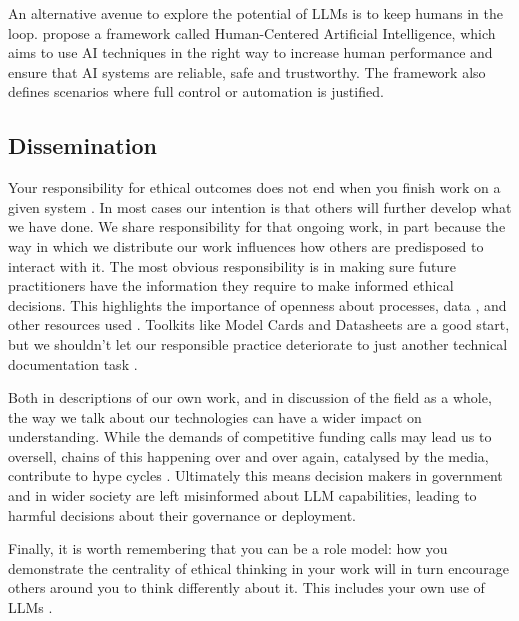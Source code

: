 An alternative avenue to explore the potential of LLMs is to keep humans in the loop. \citet{shneiderman_human-centered_2020} propose a framework called Human-Centered Artificial Intelligence, which aims to use AI techniques in the right way to increase human performance and ensure that AI systems are reliable, safe and trustworthy. The framework also defines scenarios where full control or automation is justified.


\subsection{Dissemination}\label{subsec:diss}
Your responsibility for ethical outcomes does not end when you finish work on a given system \citep{widder2023dislocated}. In most cases our intention is that others will further develop what we have done. We share responsibility for that ongoing work, in part because the way in which we distribute our work influences how others are predisposed to interact with it. The most obvious responsibility is in making sure future practitioners have the information they require to make informed ethical decisions. This highlights the importance of openness about processes, data \citep{mieskes_quantitative_2017}, and other resources used \cite{schwartz_green_2019}. Toolkits like Model Cards and Datasheets \citep{mitchell_model_2019, gebru2021datasheets} are a good start, but we shouldn't let our responsible practice deteriorate to just another technical documentation task \citep{widder_epistemic_2024}. 

Both in descriptions of our own work, and in discussion of the field as a whole, the way we talk about our technologies can have a wider impact on understanding. While the demands of competitive funding calls may lead us to oversell, chains of this happening over and over again, catalysed by the media, contribute to hype cycles \citep{markelius2024mechanisms}. Ultimately this means decision makers in government and in wider society are left misinformed about LLM capabilities, leading to harmful decisions about their governance or deployment. 

Finally, it is worth remembering that you can be a role model: how you demonstrate the centrality of ethical  thinking in your work will in turn encourage others around you to think differently about it. This includes your own use of LLMs \citep{guleria_chatgpt_2023,lund_chatgpt_2023}.

